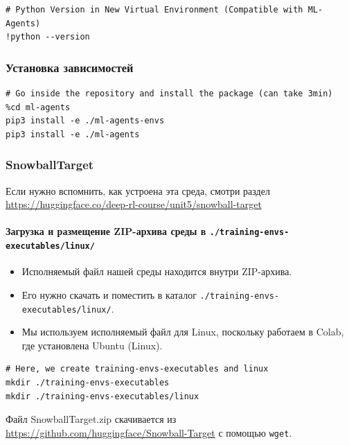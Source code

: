 \documentclass[11pt,a4paper]{article}
\begin{document}
\begin{lstlisting}
# Python Version in New Virtual Environment (Compatible with ML-Agents)
!python --version
\end{lstlisting}

\subsubsection{Установка зависимостей}\label{installing-the-dependencies}

\begin{lstlisting}
# Go inside the repository and install the package (can take 3min)
%cd ml-agents
pip3 install -e ./ml-agents-envs
pip3 install -e ./ml-agents
\end{lstlisting}

\subsubsection{SnowballTarget}\label{snowballtarget}

Если нужно вспомнить, как устроена эта среда, смотри раздел \url{https://huggingface.co/deep-rl-course/unit5/snowball-target}

\paragraph{Загрузка и размещение ZIP-архива среды в \texttt{./training-envs-executables/linux/}}\label{download-and-move-the-environment-zip-file-in-.training-envs-executableslinux}

\begin{itemize}
\tightlist
\item
  Исполняемый файл нашей среды находится внутри ZIP-архива.
\item
  Его нужно скачать и поместить в каталог \texttt{./training-envs-executables/linux/}.
\item
  Мы используем исполняемый файл для Linux, поскольку работаем в Colab, где установлена Ubuntu (Linux).
\end{itemize}

\begin{lstlisting}
# Here, we create training-envs-executables and linux
mkdir ./training-envs-executables
mkdir ./training-envs-executables/linux
\end{lstlisting}

Файл SnowballTarget.zip скачивается из \url{https://github.com/huggingface/Snowball-Target} с помощью \texttt{wget}.
\end{document}
